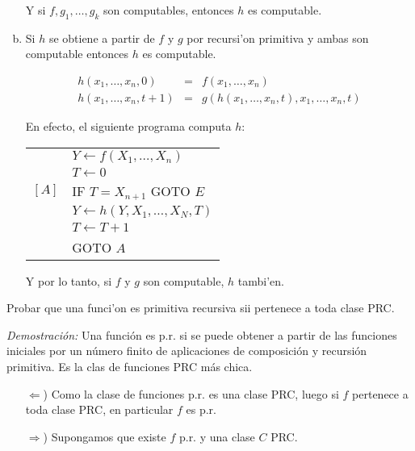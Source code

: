 \begin{questions}
\begin{solution}
\begin{enumerate}[(a)]
  Y si $f, g_1, \dots, g_k$ son computables, entonces $h$ es computable.
  
  \item Si $h$ se obtiene a partir de $f$ y $g$ por recursi'on primitiva y ambas son computable entonces $h$ es computable. 
  
  \begin{eqnarray*}
    h(x_1, \dots, x_n, 0) &=& f(x_1, \dots, x_n) \\
    h(x_1, \dots, x_n, t+1) &=& g(h(x_1, \dots, x_n, t), x_1, \dots, x_n, t)
  \end{eqnarray*}

  
  En efecto, el siguiente programa computa $h$: 
  
  \vspace{0.5cm}
  \begin{tabular}{rl}
	  & $Y \leftarrow f(X_1, \dots, X_n)$ \\ 
	  & $T \leftarrow 0$ \\ 
    $[A]$ & IF $T=X_{n+1}$ GOTO $E$ \\
	  & $Y \leftarrow h(Y,X_1, \dots, X_N, T)$ \\
	  & $T \leftarrow T+1$ \\
	  & GOTO $A$
  \end{tabular}
  \vspace{0.5cm}
  
  Y por lo tanto, si $f$ y $g$ son computable, $h$ tambi'en. 
  \end{enumerate}
\end{solution}

\question Probar que una funci'on es primitiva recursiva sii pertenece a toda clase PRC.


\begin{solution}
  
  {\it Demostraci\'on: } Una funci\'on es p.r. si se puede obtener a partir de las funciones iniciales por un n\'umero finito de aplicaciones de composici\'on y recursi\'on primitiva. Es la clas de funciones PRC m\'as chica. 
  
  \begin{itemize}
   \item[$\Leftarrow$)] Como la clase de funciones p.r. es una clase PRC, luego si $f$ pertenece a toda clase PRC, en particular $f$ es p.r.
   
   \item[$\Rightarrow$)] Supongamos que existe $f$ p.r. y una clase $C$ PRC. 


\end{itemize}
\end{solution}
\end{questions}
